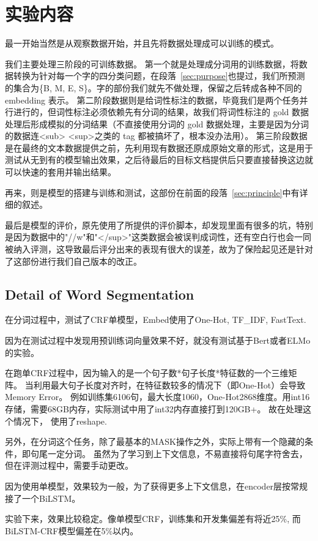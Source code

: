 \section{实验内容}
\label{sec:experiment}

最一开始当然是从观察数据开始，并且先将数据处理成可以训练的模式。

我们主要处理三阶段的可训练数据。
第一个就是处理成分词用的训练数据，将数据转换为针对每一个字的四分类问题，在段落~\ref{sec:purpose}也提过，我们所预测的集合为\{B, M, E, S\}。字的部份我们就先不做处理，保留之后转成各种不同的 embedding 表示。
第二阶段数据则是给词性标注的数据，毕竟我们是两个任务并行进行的，但词性标注必须依赖先有分词的结果，故我们将词性标注的 gold 数据处理后形成模拟的分词结果（不直接使用分词的 gold 数据处理，主要是因为分词的数据连<sub> <sup>之类的 tag 都被搞坏了，根本没办法用）。
第三阶段数据是在最终的文本数据提供之前，先利用现有数据还原成原始文章的形式，这是用于测试从无到有的模型输出效果，之后待最后的目标文档提供后只要直接替换这边就可以快速的套用并输出结果。

再来，则是模型的搭建与训练和测试，这部份在前面的段落~\ref{sec:principle}中有详细的叙述。

最后是模型的评价，原先使用了所提供的评价脚本，却发现里面有很多的坑，特别是因为数据中的"//w"和"</sup>"这类数据会被误判成词性，还有空白行也会一同被纳入评测，这导致最后评分出来的表现有很大的误差，故为了保险起见还是针对了这部份进行我们自己版本的改正。

\subsection*{Detail of Word Segmentation}

在分词过程中，测试了CRF单模型，Embed使用了One-Hot, TF\_IDF, FastText.

因为在测试过程中发现用预训练词向量效果不好，就没有测试基于Bert或者ELMo的实验。

在跑单CRF过程中，因为输入的是一个句子数*句子长度*特征数的一个三维矩阵。
当利用最大句子长度对齐时，在特征数较多的情况下（即One-Hot）会导致Memory Error。
例如训练集6106句，最大长度1060，One-Hot2868维度。用int16存储，需要68GB内存，实际测试中用了int32内存直接打到120GB+。
故在处理这个情况下， 使用了reshape.

另外，在分词这个任务，除了最基本的MASK操作之外，实际上带有一个隐藏的条件，即句尾一定分词。
虽然为了学习到上下文信息，不易直接将句尾字符舍去，但在评测过程中，需要手动更改。

因为使用单模型，效果较为一般，为了获得更多上下文信息，在encoder层按常规接了一个BiLSTM。

实验下来，效果比较稳定。像单模型CRF，训练集和开发集偏差有将近25\%, 而BiLSTM-CRF模型偏差在5\%以内。